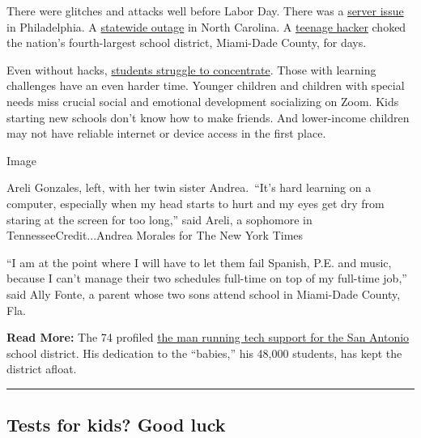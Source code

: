 There were glitches and attacks well before Labor Day. There was a
\href{https://philadelphia.cbslocal.com/2020/09/03/philadelphia-school-district-hoping-for-smoother-day-following-technical-glitches-on-first-day-of-virtual-learning/}{server
issue} in Philadelphia. A
\href{https://www.charlotteobserver.com/news/local/education/article245014230.html}{statewide
outage} in North Carolina. A
\href{https://www.nytimes3xbfgragh.onion/2020/09/03/us/miami-dade-school-cyberattack.html}{teenage
hacker} choked the nation's fourth-largest school district, Miami-Dade
County, for days.

Even without hacks,
\href{https://www.nytimes3xbfgragh.onion/2020/09/08/learning/school-hopes-concerns.html}{students
struggle to concentrate}. Those with learning challenges have an even
harder time. Younger children and children with special needs miss
crucial social and emotional development socializing on Zoom. Kids
starting new schools don't know how to make friends. And lower-income
children may not have reliable internet or device access in the first
place.

Image

Areli Gonzales, left, with her twin sister Andrea.~``It's hard learning
on a computer, especially when my head starts to hurt and my eyes get
dry from staring at the screen for too long,'' said Areli, a sophomore
in TennesseeCredit...Andrea Morales for The New York Times

``I am at the point where I will have to let them fail Spanish, P.E. and
music, because I can't manage their two schedules full-time on top of my
full-time job,'' said Ally Fonte, a parent whose two sons attend school
in Miami-Dade County, Fla.

\textbf{Read More:} The 74 profiled
\href{https://www.the74million.org/article/from-i-t-guy-to-mvp-the-pandemic-thrusts-san-antonio-isds-ken-thompson-into-the-center-of-the-action/}{the
man running tech support for the San Antonio} school district. His
dedication to the ``babies,'' his 48,000 students, has kept the district
afloat.

\begin{center}\rule{0.5\linewidth}{\linethickness}\end{center}

\hypertarget{tests-for-kids-good-luck}{%
\subsection{Tests for kids? Good luck}\label{tests-for-kids-good-luck}}

